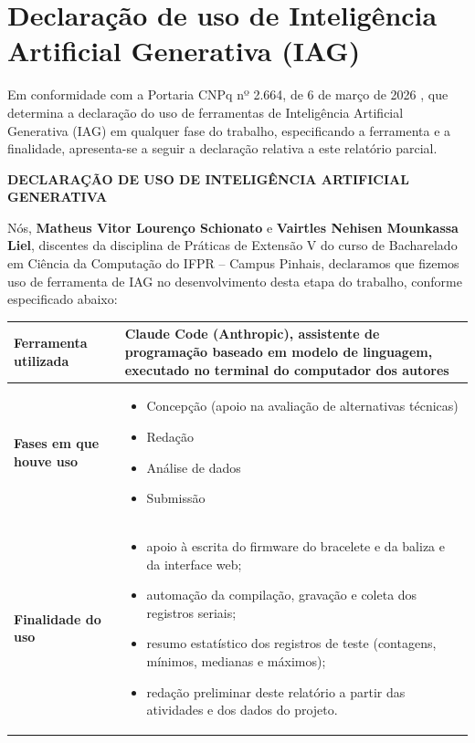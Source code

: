 \chapter{Declaração de uso de Inteligência Artificial Generativa (IAG)}
\label{ap:iag}

\noindent
Em conformidade com a Portaria CNPq nº 2.664, de 6 de março de 2026 \cite{cnpq2026portaria}, que determina a declaração do uso de ferramentas de Inteligência Artificial Generativa (IAG) em qualquer fase do trabalho, especificando a ferramenta e a finalidade, apresenta-se a seguir a declaração relativa a este relatório parcial.

\bigskip
\begin{center}
\textbf{\large DECLARAÇÃO DE USO DE INTELIGÊNCIA ARTIFICIAL GENERATIVA}
\end{center}

\bigskip
\noindent
Nós, \textbf{Matheus Vitor Lourenço Schionato} e \textbf{Vairtles Nehisen Mounkassa Liel}, discentes da disciplina de Práticas de Extensão V do curso de Bacharelado em Ciência da Computação do IFPR -- Campus Pinhais, declaramos que fizemos uso de ferramenta de IAG no desenvolvimento desta etapa do trabalho, conforme especificado abaixo:

\bigskip
\begin{center}
\small
\begin{tabular}{|p{4.2cm}|p{9.8cm}|}
\hline
\textbf{Ferramenta utilizada} & Claude Code (Anthropic), assistente de programação baseado em modelo de linguagem, executado no terminal do computador dos autores \\
\hline
\textbf{Fases em que houve uso} &
\begin{itemize}[leftmargin=*, nosep]
  \item[$\blacksquare$] Concepção (apoio na avaliação de alternativas técnicas)
  \item[$\blacksquare$] Redação
  \item[$\blacksquare$] Análise de dados
  \item[$\square$] Submissão
\end{itemize} \\
\hline
\textbf{Finalidade do uso} &
\begin{itemize}[leftmargin=*, nosep]
  \item apoio à escrita do firmware do bracelete e da baliza e da interface web;
  \item automação da compilação, gravação e coleta dos registros seriais;
  \item resumo estatístico dos registros de teste (contagens, mínimos, medianas e máximos);
  \item redação preliminar deste relatório a partir das atividades e dos dados do projeto.
\end{itemize} \\
\hline
\end{tabular}
\end{center}


